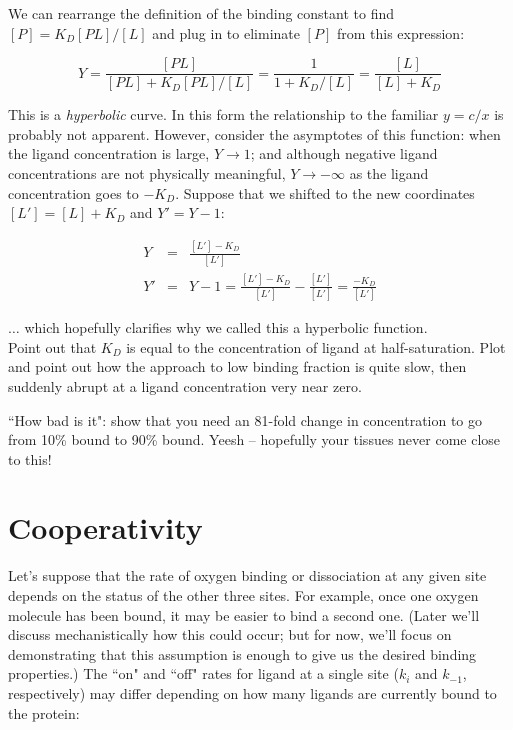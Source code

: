 \documentclass{article}
\begin{document}
We can rearrange the definition of the binding constant to find $[P] = K_D[PL]/[L]$ and plug in to eliminate $[P]$ from this expression:

\[ Y = \frac{\left[ PL \right]}{\left[ PL \right] + K_D\left[ PL \right]/\left[ L \right]} = \frac{1}{1 + K_D/\left[ L \right]} = \frac{\left[ L \right]}{\left[ L \right] + K_D} \]

This is a \textit{hyperbolic} curve. In this form the relationship to the familiar $y=c/x$ is probably not apparent. However, consider the asymptotes of this function: when the ligand concentration is large, $Y \to 1$; and although negative ligand concentrations are not physically meaningful, $Y \to - \infty$ as the ligand concentration goes to $-K_D$. Suppose that we shifted to the new coordinates $\left[ L' \right] = \left[ L \right] + K_D$ and $Y' = Y - 1$:

\begin{eqnarray*}
Y & = & \frac{\left[ L' \right] - K_D}{\left[ L' \right]}\\
Y' & = & Y - 1 = \frac{\left[ L' \right] - K_D}{\left[ L' \right]} - \frac{\left[ L' \right]}{\left[ L' \right]} = \frac{- K_D}{\left[ L' \right]}
\end{eqnarray*}

$\ldots$ which hopefully clarifies why we called this a hyperbolic function.\\

Point out that $K_D$ is equal to the concentration of ligand at half-saturation. Plot and point out how the approach to low binding fraction is quite slow, then suddenly abrupt at a ligand concentration very near zero.

``How bad is it": show that you need an 81-fold change in concentration to go from 10\% bound to 90\% bound. Yeesh -- hopefully your tissues never come close to this!

\section*{Cooperativity}
Let's suppose that the rate of oxygen binding or dissociation at any given site depends on the status of the other three sites. For example, once one oxygen molecule has been bound, it may be easier to bind a second one. (Later we'll discuss mechanistically how this could occur; but for now, we'll focus on demonstrating that this assumption is enough to give us the desired binding properties.) The ``on" and ``off" rates for ligand at a single site ($k_i$ and $k_{-1}$, respectively) may differ depending on how many ligands are currently bound to the protein:
\end{document}
